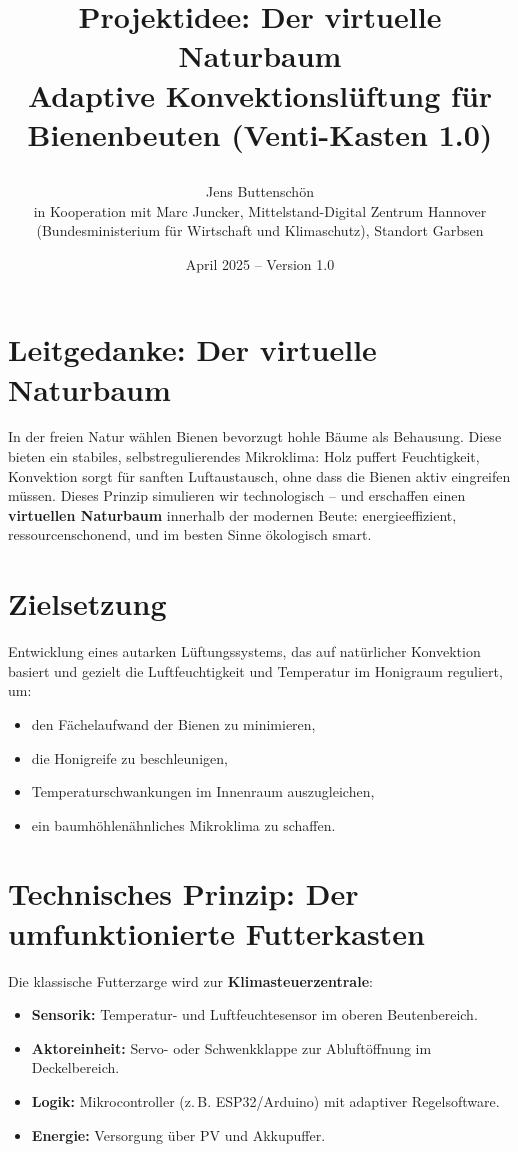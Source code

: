 \documentclass[11pt,a4paper]{article}
\title{\parbox{\linewidth}{\centering\textbf{
Projektidee: Der virtuelle Naturbaum\\
Adaptive Konvektionslüftung für Bienenbeuten (Venti-Kasten 1.0)}}}
\author{\parbox{\linewidth}{\centering
Jens Buttenschön\\
\small in Kooperation mit Marc Juncker, Mittelstand-Digital Zentrum Hannover\\
(Bundesministerium für Wirtschaft und Klimaschutz), Standort Garbsen}}
\date{April 2025 – Version 1.0}
\begin{document}
\maketitle

\section*{Leitgedanke: Der virtuelle Naturbaum}
In der freien Natur wählen Bienen bevorzugt hohle Bäume als Behausung. Diese bieten ein stabiles, selbstregulierendes Mikroklima: Holz puffert Feuchtigkeit, Konvektion sorgt für sanften Luftaustausch, ohne dass die Bienen aktiv eingreifen müssen. 
Dieses Prinzip simulieren wir technologisch – und erschaffen einen \textbf{virtuellen Naturbaum} innerhalb der modernen Beute: energieeffizient, ressourcenschonend, und im besten Sinne ökologisch smart.

\section{Zielsetzung}
Entwicklung eines autarken Lüftungssystems, das auf natürlicher Konvektion basiert und gezielt die Luftfeuchtigkeit und Temperatur im Honigraum reguliert, um:
\begin{itemize}[topsep=2pt]
  \item den Fächelaufwand der Bienen zu minimieren,
  \item die Honigreife zu beschleunigen,
  \item Temperaturschwankungen im Innenraum auszugleichen,
  \item ein baumhöhlenähnliches Mikroklima zu schaffen.
\end{itemize}

\section{Technisches Prinzip: Der umfunktionierte Futterkasten}
Die klassische Futterzarge wird zur \textbf{Klimasteuerzentrale}:
\begin{itemize}[topsep=2pt]
  \item \textbf{Sensorik:} Temperatur- und Luftfeuchtesensor im oberen Beutenbereich.
  \item \textbf{Aktoreinheit:} Servo- oder Schwenkklappe zur Abluftöffnung im Deckelbereich.
  \item \textbf{Logik:} Mikrocontroller (z.\,B. ESP32/Arduino) mit adaptiver Regelsoftware.
  \item \textbf{Energie:} Versorgung über PV und Akkupuffer.
\end{itemize}
\end{document}
